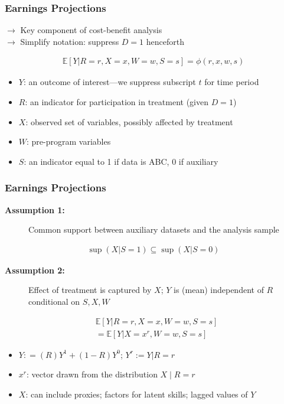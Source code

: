 \documentclass[static]{JJH-Beamer}
\begin{document}

\begin{frame}
\frametitle{Earnings Projections}

$\rightarrow$ Key component of cost-benefit analysis \\
$\rightarrow$ Simplify notation: suppress $D =1$ henceforth 

\begin{align}
	\mathbb{E}  \left[ Y | R = r, X = x, W = w, S = s\right]= \phi \left(r, x, w, s \right)
\end{align}
\begin{itemize}
	\item $Y$: an outcome of interest---we suppress subscript $t$ for time period
	\item $R$: an indicator for participation in treatment (given $D=1$)
	\item $X$: observed set of variables, possibly affected by treatment
	\item $W$: pre-program variables
	\item $S$: an indicator equal to 1 if data is ABC, 0 if auxiliary
\end{itemize}
\end{frame}

\begin{frame}
\frametitle{Earnings Projections}
\begin{description}
	\item [\textbf{Assumption 1:}] Common support between auxiliary datasets and the analysis sample
\end{description}
\begin{align*}
	\sup \left( X | S = 1 \right) \subseteq \sup \left( X | S = 0 \right)
\end{align*}
\begin{description}
	\item [\textbf{Assumption 2:}] Effect of treatment is captured by $X$; $Y$ is (mean) independent of $R$ conditional on $S, X, W$
\end{description}
\begin{align*}
	& \mathbb{E} \left[ Y | R = r, X = x, W = w, S = s \right] \\ %
	&= \mathbb{E} \left[ Y | X = x^{r}, W = w, S = s \right]
\end{align*}

\begin{itemize}
	\item $Y : = \left( R\right)  Y^1 + (1 - R)Y^0$; $Y^r:= Y| R = r$
	\item $x^r$: vector drawn from the distribution $X \mid R=r$
	\item $X$: can include proxies; factors for latent skills; lagged values of $Y$ 
\end{itemize}
\end{frame}
\end{document}
